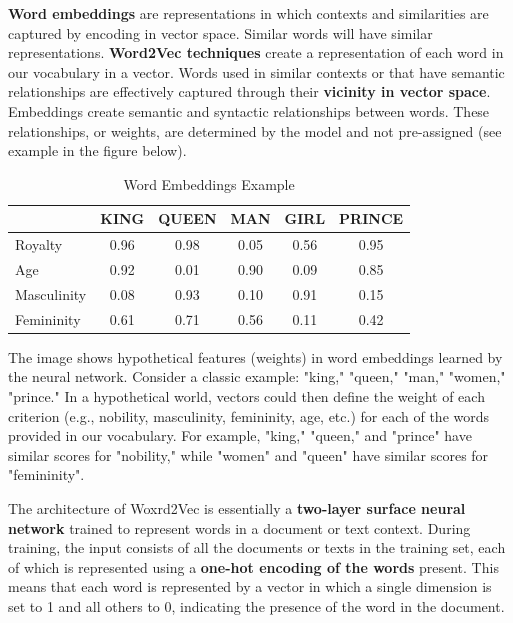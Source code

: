 \textbf{Word embeddings} are representations in which contexts and similarities are captured by encoding in vector space. Similar words will have similar representations. \textbf{Word2Vec techniques} create a representation of each word in our vocabulary in a vector. Words used in similar contexts or that have semantic relationships are effectively captured through their \textbf{vicinity in vector space}. Embeddings create semantic and syntactic relationships between words. These relationships, or weights, are determined by the model and not pre-assigned (see example in the figure below).

\begin{table}[h]
\centering
\begin{tabular}{l|c|c|c|c|c}
& KING & QUEEN & MAN & GIRL & PRINCE \\
\hline
Royalty & \cellcolor{myred!10}0.96 & \cellcolor{myred!10}0.98 & \cellcolor{mygreen!10}0.05 & \cellcolor{myblue!10}0.56 & \cellcolor{myred!10}0.95 \\
Age & \cellcolor{myred!10}0.92 & \cellcolor{mygreen!10}0.01 & \cellcolor{myred!10}0.90 & \cellcolor{mygreen!10}0.09 & \cellcolor{myred!10}0.85 \\
Masculinity & \cellcolor{mygreen!10}0.08 & \cellcolor{myred!10}0.93 & \cellcolor{mygreen!10}0.10 & \cellcolor{myred!10}0.91 & \cellcolor{mygreen!10}0.15 \\
Femininity & \cellcolor{myblue!10}0.61 & \cellcolor{myblue!10}0.71 & \cellcolor{myblue!10}0.56 & \cellcolor{mygreen!10}0.11 & \cellcolor{myblue!10}0.42 \\
\end{tabular}
\caption{Word Embeddings Example}
\end{table}

The image shows hypothetical features (weights) in word embeddings learned by the neural network. Consider a classic example: "king," "queen," "man," "women," "prince." In a hypothetical world, vectors could then define the weight of each criterion (e.g., nobility, masculinity, femininity, age, etc.) for each of the words provided in our vocabulary. For example, "king," "queen," and "prince" have similar scores for "nobility," while "women" and "queen" have similar scores for "femininity".

The architecture of Woxrd2Vec is essentially a \textbf{two-layer surface neural network} trained to represent words in a document or text context. During training, the input consists of all the documents or texts in the training set, each of which is represented using a \textbf{one-hot encoding of the words} present. This means that each word is represented by a vector in which a single dimension is set to 1 and all others to 0, indicating the presence of the word in the document.

